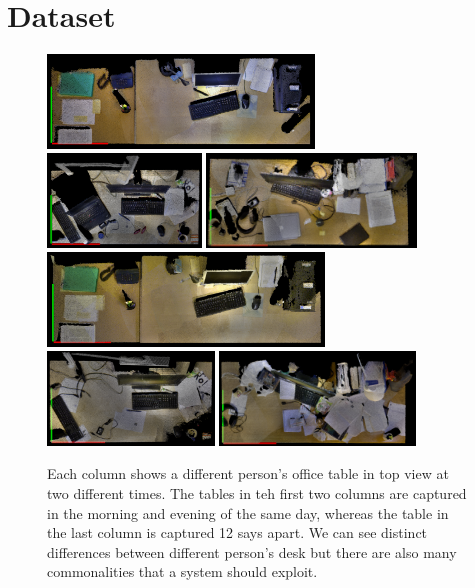 \documentclass[letterpaper, 10 pt, conference]{ieeeconf}  %
\begin{document}
\section{Dataset}
\label{sec:Dataset}

\begin{figure}
\begin{center}
\includegraphics[height=2.5cm]{David_Mor_131110} \quad
\includegraphics[height=2.5cm]{Nils_Mor_131111} \quad
\includegraphics[height=2.5cm]{Puren_Eve_131029}\\ \smallskip
\includegraphics[height=2.5cm]{David_Eve_131110} \enskip
\includegraphics[height=2.5cm]{Nils_Eve_131111} \enskip
\includegraphics[height=2.5cm]{Puren_Mor_131110}
\caption{Each column shows a different person's office table in top view at two different times. The tables in teh first two columns are captured in the morning and evening of the same day, whereas the table in the last column is captured 12 says apart. We can see distinct differences between different person's desk but there are also many commonalities that a system should exploit. }
\label{fig:Example Scenes}
\end{center}
\end{figure}
\end{document}

